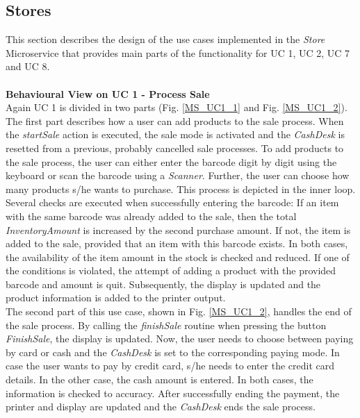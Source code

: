 		\FloatBarrier
			
		\subsection{Stores}
			This section describes the design of the use cases implemented in the \textit{Store} Microservice that provides main parts of the functionality for UC 1, UC 2, UC 7 and UC 8.\\
	
		\noindent
		\\
		\textbf{Behavioural View on UC 1 - Process Sale} \\
		Again UC 1 is divided in two parts (Fig. \ref{MS_UC1_1} and Fig. \ref{MS_UC1_2}).
		The first part describes how a user can add products to the sale process. When the \textit{startSale} action is executed, the sale mode is activated and the \textit{CashDesk} is resetted from a previous, probably cancelled sale processes. To add products to the sale process, the user can either enter the barcode digit by digit using the keyboard or scan the barcode using a \textit{Scanner}. Further, the user can choose how many products s/he wants to purchase. This process is depicted in the inner loop. 
		\\
		Several checks are executed when successfully entering the barcode: If an item with the same barcode was already added to the sale, then the total \textit{InventoryAmount}  is increased by the second purchase amount. If not, the item is added to the sale, provided that an item with this barcode exists. In both cases, the availability of the item amount in the stock is checked and reduced. If one of the conditions is violated, the attempt of adding a product with the provided barcode and amount is quit. 
		Subsequently, the display is updated and the product information is added to the printer output.
		\\
		The second part of this use case, shown in Fig. \ref{MS_UC1_2}, handles the end of the sale process. By calling the \textit{finishSale} routine when pressing the button \textit{FinishSale}, the display is updated. Now, the user needs to choose between paying by card or cash and the \textit{CashDesk} is set to the corresponding paying mode. In case the user wants to pay by credit card, s/he needs to enter the credit card details. In the other case, the cash amount is entered. In both cases, the information is checked to accuracy.
		After successfully ending the payment, the printer and display are updated and the \textit{CashDesk} ends the sale process.

